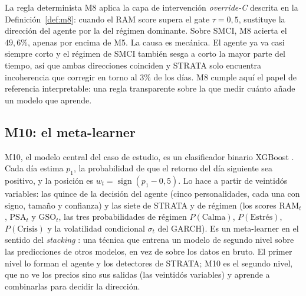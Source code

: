 La regla determinista M8 aplica la capa de intervención \emph{override-C} descrita en la Definición~\ref{def:m8}: cuando el RAM score supera el gate $\tau=0{,}5$, sustituye la dirección del agente por la del régimen dominante. Sobre SMCI, M8 acierta el $49{,}6\%$, apenas por encima de M5. La causa es mecánica. El agente ya va casi siempre corto y el régimen de SMCI también sesga a corto la mayor parte del tiempo, así que ambas direcciones coinciden y STRATA solo encuentra incoherencia que corregir en torno al $3\%$ de los días. M8 cumple aquí el papel de referencia interpretable: una regla transparente sobre la que medir cuánto añade un modelo que aprende.

\subsection{M10: el meta-learner}
\label{sec:smci-m10}

M10, el modelo central del caso de estudio, es un clasificador binario XGBoost \cite{chen2016}. Cada día estima $p_1$, la probabilidad de que el retorno del día siguiente sea positivo, y la posición es $w_t = \operatorname{sign}(p_1 - 0{,}5)$. Lo hace a partir de veintidós variables: las quince de la decisión del agente (cinco personalidades, cada una con signo, tamaño y confianza) y las siete de STRATA y de régimen (los scores $\mathrm{RAM}_t$, $\mathrm{PSA}_t$ y $\mathrm{GSO}_t$, las tres probabilidades de régimen $P(\text{Calma})$, $P(\text{Estrés})$, $P(\text{Crisis})$ y la volatilidad condicional $\sigma_t$ del GARCH). Es un meta-learner en el sentido del \emph{stacking} \cite{wolpert1992}: una técnica que entrena un modelo de segundo nivel sobre las predicciones de otros modelos, en vez de sobre los datos en bruto. El primer nivel lo forman el agente y los detectores de STRATA; M10 es el segundo nivel, que no ve los precios sino sus salidas (las veintidós variables) y aprende a combinarlas para decidir la dirección.


